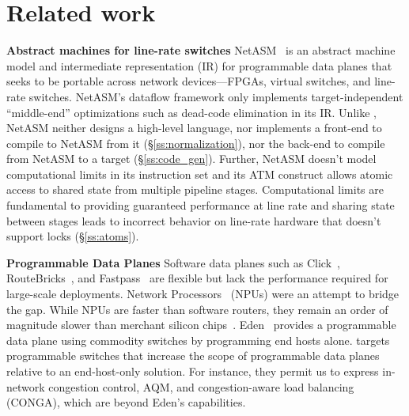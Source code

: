 \section{Related work}
\label{s:related}

\textbf{Abstract machines for line-rate switches}
NetASM~\cite{netasm} is an abstract machine model and intermediate
representation (IR) for programmable data planes that seeks to be portable
across network devices---FPGAs, virtual switches, and line-rate switches.
NetASM's dataflow framework only implements target-independent ``middle-end''
optimizations such as dead-code elimination in its IR. Unlike \pktlanguage,
NetASM neither designs a high-level language, nor implements  a front-end to
compile to NetASM from it (\S\ref{ss:normalization}), nor the back-end to
compile from NetASM to a target (\S\ref{ss:code_gen}). Further, NetASM doesn't
model computational limits in its instruction set and its ATM construct allows
atomic access to shared state from multiple pipeline stages.  Computational
limits are fundamental to providing guaranteed performance at line rate and
sharing state between stages leads to incorrect behavior on line-rate hardware
that doesn't support locks (\S\ref{ss:atoms}).

\textbf{Programmable Data Planes}
Software data planes such as Click~\cite{click},
RouteBricks~\cite{routebricks}, and Fastpass~\cite{fastpass} are flexible but
lack the performance required for large-scale deployments. Network
Processors~\cite{ixp2800, ixp4xx} (NPUs) were an attempt to bridge the gap.
While NPUs are faster than software routers, they remain an order of magnitude
slower than merchant silicon chips~\cite{rmt}. Eden~\cite{eden} provides a
programmable data plane using commodity switches by programming end hosts
alone. \pktlanguage targets programmable switches that increase the scope of
programmable data planes relative to an end-host-only solution. For instance,
they permit us to express in-network congestion control, AQM, and
congestion-aware load balancing (CONGA), which are beyond Eden's capabilities.

